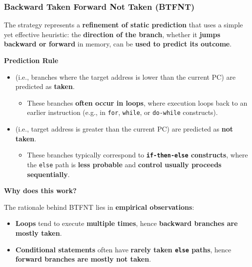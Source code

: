 \subsubsection{Backward Taken Forward Not Taken (BTFNT)}

The  strategy represents a \textbf{refinement of static prediction} that uses a simple yet effective heuristic: the \textbf{direction of the branch}, whether it \textbf{jumps backward or forward} in memory, can be \textbf{used to predict its outcome}.

\highspace
\begin{flushleft}
    \textcolor{Green3}{ \textbf{Prediction Rule}}
\end{flushleft}
\begin{itemize}
    \item {} (i.e., branches where the target address is lower than the current PC) are predicted as \textbf{taken}.
    \begin{itemize}
        \item These branches \textbf{often occur in loops}, where execution loops back to an earlier instruction (e.g., in \texttt{for}, \texttt{while}, or \texttt{do-while} constructs).
    \end{itemize}    
    \item {} (i.e., target address is greater than the current PC) are predicted as \textbf{not taken}.
    \begin{itemize}
        \item These branches typically correspond to \textbf{\texttt{if-then-else} constructs}, where the \texttt{else} path is \textbf{less probable} and \textbf{control usually proceeds sequentially}.
    \end{itemize}
\end{itemize}

\highspace
\begin{flushleft}
    \textcolor{Green3}{ \textbf{Why does this work?}}
\end{flushleft}
The rationale behind BTFNT lies in \textbf{empirical observations}:
\begin{itemize}
    \item \textbf{Loops} tend to execute \textbf{multiple times}, hence \textbf{backward branches are mostly taken}.
    \item \textbf{Conditional statements} often have \textbf{rarely taken \texttt{else} paths}, hence \textbf{forward branches are mostly not taken}.
\end{itemize}


